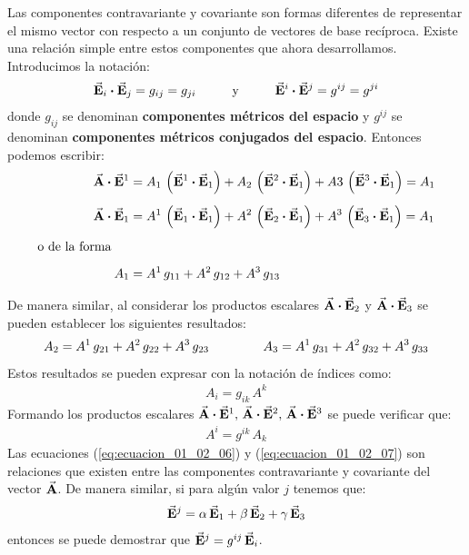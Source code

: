 \documentclass[hidelinks,12pt]{article}
\begin{document}
Las componentes contravariante y covariante son formas diferentes de representar el mismo vector con respecto a un conjunto de vectores de base recíproca. Existe una relación simple entre estos componentes que ahora desarrollamos. Introducimos la notación:
\begin{align}
\va{E}_{i} \vdot \va{E}_{j} = g_{ij} = g_{ji}  \hspace{1cm} \text{y} \hspace{1cm} \va{E}^{i} \vdot \va{E}^{j} = g^{ij} = g^{ji}
\label{eq:ecuacion_01_02_03}
\end{align}
donde $g_{ij}$ se denominan \textbf{componentes métricos del espacio} y $g^{ij}$ se denominan \textbf{componentes métricos conjugados del espacio}. Entonces podemos escribir:
\begin{align}
\begin{aligned}[b]
\va{A} \vdot \va{E}^{1} &= A_{1} \, \left( \va{E}^{1} \vdot \va{E}_{1} \right) + A_{2} \, \left( \va{E}^{2} \vdot \va{E}_{1} \right) + A{3} \, \left( \va{E}^{3} \vdot\va{E}_{1} \right) = A_{1} \\[0.5em]
\va{A} \vdot \va{E}_{1} &= A^{1} \, \left( \va{E}_{1} \vdot \va{E}_{1} \right) + A^{2} \, \left( \va{E}_{2} \vdot \va{E}_{1} \right) + A^{3} \, \left( \va{E}_{3} \vdot \va{E}_{1} \right) = A_{1} \\[0.5em]
\mbox{o de la forma} \hspace{0.5cm} &{} \\[0.5em]
A_{1} &= A^{1} \, g_{11} + A^{2} \, g_{12} + A^{3} \, g_{13}
\end{aligned}
\label{eq:ecuacion_01_02_04}
\end{align}

De manera similar, al considerar los productos escalares $\va{A} \vdot \va{E}_{2}$ y $\va{A} \vdot \va{E}_{3}$ se pueden establecer los siguientes resultados:
\begin{align*}
A_{2} = A^{1} \, g_{21} + A^{2} \, g_{22} + A^{3} \, g_{23} \hspace{1.5cm} A_{3} = A^{1} \, g_{31} + A^{2} \, g_{32} + A^{3} \, g_{33}
\end{align*}
Estos resultados se pueden expresar con la notación de índices como:
\begin{align}
A_{i} = g_{ik} \, A^{k}
\label{eq:ecuacion_01_02_06}
\end{align}
Formando los productos escalares  $\va{A} \vdot \va{E}^{1}, \, \va{A} \vdot \va{E}^{2}, \, \va{A} \vdot \va{E}^{3}$ se puede verificar que:
\begin{align}
A^{i} = g^{ik} \, A_{k}
\label{eq:ecuacion_01_02_07}
\end{align}
Las ecuaciones (\ref{eq:ecuacion_01_02_06}) y (\ref{eq:ecuacion_01_02_07}) son relaciones que existen entre las componentes contravariante y covariante del vector $\va{A}$. De manera similar, si para algún valor $j$ tenemos que:
\begin{align*}
\va{E}^{j} = \alpha \, \va{E}_{1} + \beta \, \va{E}_{2} + \gamma \, \va{E}_{3}
\end{align*}
entonces se puede demostrar que $\va{E}^{j} = g^{ij} \, \va{E}_{i}$.
\end{document}

